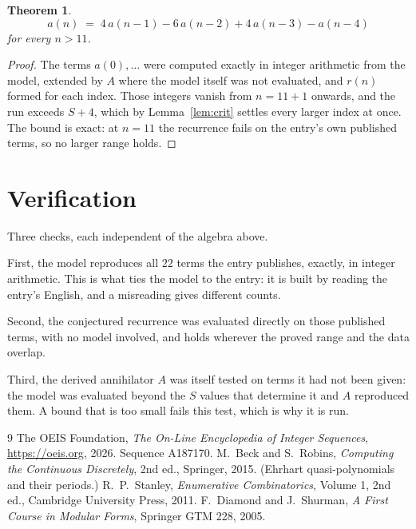 \documentclass[11pt,a4paper]{article}
\theoremstyle{plain}
\newtheorem{theorem}{Theorem}
\theoremstyle{definition}
\begin{document}
\begin{theorem}
\[
a(n)\;=\;4\,a(n-1) - 6\,a(n-2) + 4\,a(n-3) - a(n-4)
\]
for every $n>11$.
\end{theorem}

\begin{proof}
The terms $a(0),\dots$ were computed exactly in integer arithmetic from the model, extended by
$A$ where the model itself was not evaluated, and $r(n)$ formed for each index. Those integers
vanish from $n=11+1$ onwards, and the run exceeds $S+4$, which by
Lemma~\ref{lem:crit} settles every larger index at once. The bound is exact: at $n=11$ the recurrence fails on the entry's own published terms, so no larger range holds.
\end{proof}

\section{Verification}

Three checks, each independent of the algebra above.

First, the model reproduces all $22$ terms the entry publishes, exactly, in integer
arithmetic. This is what ties the model to the entry: it is built by reading the entry's
English, and a misreading gives different counts.

Second, the conjectured recurrence was evaluated directly on those published terms, with no
model involved, and holds wherever the proved range and the data overlap.

Third, the derived annihilator $A$ was itself tested on terms it had not been given: the model
was evaluated beyond the $S$ values that determine it and $A$ reproduced them. A bound that is
too small fails this test, which is why it is run.

\begin{thebibliography}{9}
 The OEIS Foundation, \emph{The On-Line Encyclopedia of Integer
Sequences}, \url{https://oeis.org}, 2026. Sequence A187170.
 M.~Beck and S.~Robins, \emph{Computing the Continuous Discretely},
2nd ed., Springer, 2015. (Ehrhart quasi-polynomials and their periods.)
 R.~P.~Stanley, \emph{Enumerative Combinatorics}, Volume 1, 2nd ed.,
Cambridge University Press, 2011.
 F.~Diamond and J.~Shurman, \emph{A First Course in Modular Forms},
Springer GTM 228, 2005.
\end{thebibliography}
\end{document}
